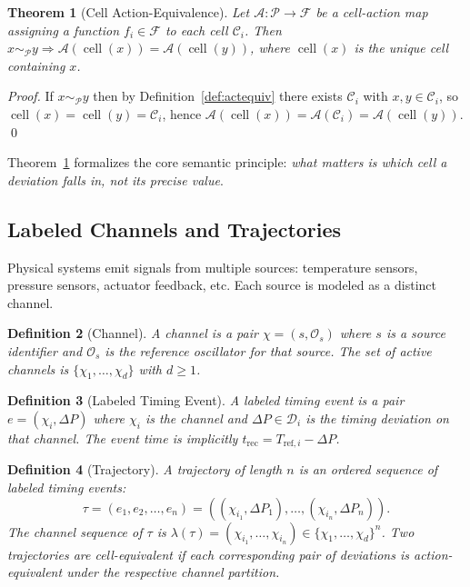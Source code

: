 \documentclass[twocolumn,10pt]{article}
\newtheorem{theorem}{Theorem}[section]
\newtheorem{definition}[theorem]{Definition}
\newcommand{\DP}{\Delta P}          %
\newcommand{\trec}{t_{\mathrm{rec}}}
\newcommand{\calC}{\mathcal{C}}     %
\newcommand{\calD}{\mathcal{D}}     %
\newcommand{\calP}{\mathcal{P}}     %
\DeclareMathOperator{\cell}{cell}
\begin{document}
\begin{theorem}[Cell Action-Equivalence]
\label{thm:cellequiv}
Let $\mathcal{A} : \calP \to \mathcal{F}$ be a cell-action map
assigning a function $f_i \in \mathcal{F}$ to each cell $\calC_i$.
Then $x \sim_{\calP} y \Rightarrow \mathcal{A}(\cell(x)) =
\mathcal{A}(\cell(y))$, where $\cell(x)$ is the unique cell
containing $x$.
\end{theorem}
\begin{proof}
If $x \sim_{\calP} y$ then by Definition~\ref{def:actequiv} there
exists $\calC_i$ with $x, y \in \calC_i$, so
$\cell(x) = \cell(y) = \calC_i$, hence
$\mathcal{A}(\cell(x)) = \mathcal{A}(\calC_i) = \mathcal{A}(\cell(y))$.
\qed
\end{proof}

Theorem~\ref{thm:cellequiv} formalizes the core semantic principle:
\emph{what matters is which cell a deviation falls in, not its
precise value}.

\subsection{Labeled Channels and Trajectories}

Physical systems emit signals from multiple sources: temperature
sensors, pressure sensors, actuator feedback, etc. Each source
is modeled as a distinct channel.

\begin{definition}[Channel]
\label{def:channel}
A \emph{channel} is a pair $\chi = (s, \mathcal{O}_s)$ where $s$ is
a source identifier and $\mathcal{O}_s$ is the reference oscillator
for that source. The set of active channels is
$\{\chi_1, \ldots, \chi_d\}$ with $d \geq 1$.
\end{definition}

\begin{definition}[Labeled Timing Event]
\label{def:event}
A \emph{labeled timing event} is a pair $e = (\chi_i, \DP)$ where
$\chi_i$ is the channel and $\DP \in \calD_i$ is the timing
deviation on that channel. The event time is implicitly
$\trec = T_{\mathrm{ref},i} - \DP$.
\end{definition}

\begin{definition}[Trajectory]
\label{def:traj}
A \emph{trajectory of length $n$} is an ordered sequence of labeled
timing events:
\begin{equation}
  \tau = (e_1, e_2, \ldots, e_n) =
  ((\chi_{i_1}, \DP_1), \ldots, (\chi_{i_n}, \DP_n)).
  \label{eq:traj}
\end{equation}
The \emph{channel sequence} of $\tau$ is
$\lambda(\tau) = (\chi_{i_1}, \ldots, \chi_{i_n}) \in
\{\chi_1, \ldots, \chi_d\}^n$.
Two trajectories are \emph{cell-equivalent} if each corresponding
pair of deviations is action-equivalent under the respective channel
partition.
\end{definition}
\end{document}
